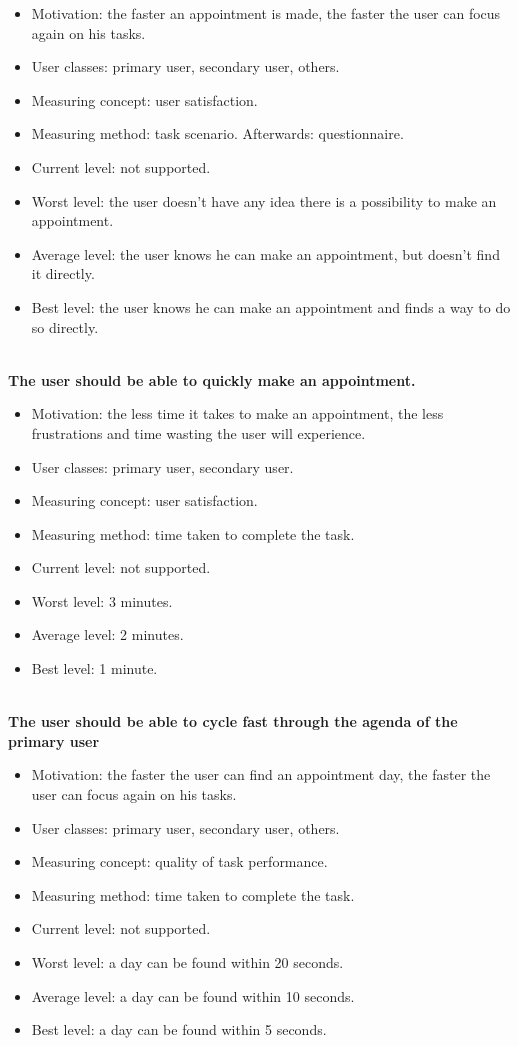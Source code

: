 \documentclass[11pt, a4paper,svglistings]{report}
\begin{document}
\begin{itemize}
\item{Motivation: the faster an appointment is made, the faster the user can focus again on his tasks.}
\item{User classes: primary user, secondary user, others.}
\item{Measuring concept: user satisfaction.}
\item{Measuring method: task scenario. Afterwards: questionnaire.}
\item{Current level: not supported.}
\item{Worst level: the user doesn't have any idea there is a possibility to make an appointment.}
\item{Average level: the user knows he can make an appointment, but doesn't find it directly.}
\item{Best level: the user knows he can make an appointment and finds a way to do so directly. \\ \\}
\end{itemize}
\textbf{The user should be able to quickly make an appointment.}
\begin{itemize}
\item{Motivation: the less time it takes to make an appointment, the less frustrations and time wasting the user will experience.}
\item{User classes: primary user, secondary user.}
\item{Measuring concept:  user satisfaction.}
\item{Measuring method: time taken to complete the task.}
\item{Current level: not supported.}
\item{Worst level: 3 minutes.}
\item{Average level: 2 minutes.}
\item{Best level: 1 minute. \\ \\}
\end{itemize}
\textbf{The user should be able to cycle fast through the agenda of the primary user}
\begin{itemize}
\item{Motivation: the faster the user can find an appointment day, the faster the user can focus again on his tasks.}
\item{User classes: primary user, secondary user, others.}
\item{Measuring concept: quality of task performance.}
\item{Measuring method: time taken to complete the task.}
\item{Current level: not supported.}
\item{Worst level: a day can be found within 20 seconds.}
\item{Average level: a day can be found within 10 seconds.}
\item{Best level: a day can be found within 5 seconds. \\ \\}
\end{itemize}
\end{document}

